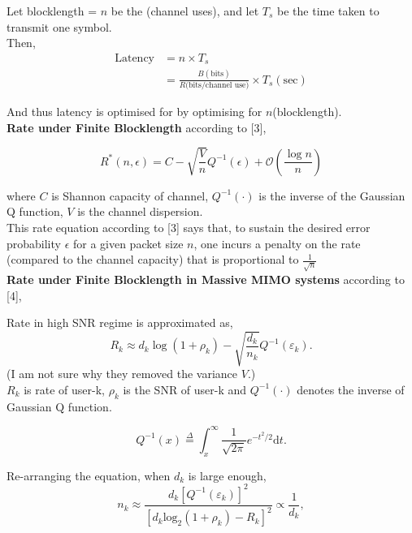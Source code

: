 \documentclass[a4paper, 12pt, onecolumn, journal, twoside, draftclsnofoot]{IEEEtran}
\begin{document}
Let blocklength = $n$ be the (channel uses), and let $T_s$ be the time taken to transmit one symbol. \\

Then,
\begin{equation*}
\begin{split}
\text{Latency} 
    &= n \times T_s \\ 
    &= \frac{B (\text{bits})}{R\text{(bits/channel use)}} \times T_s (\text{sec})
\end{split}
\end{equation*}

And thus latency is optimised for by optimising for $n$(blocklength). \\

\textbf{Rate under Finite Blocklength} according to [3],

\begin{equation*}
    R^*(n,\epsilon)=C-\sqrt{\frac{V}{n}}Q^{-1}(\epsilon)+\mathcal{O}\left(\frac{\log n}{n}\right)
\end{equation*}

where $C$ is Shannon capacity of channel, $Q^{-1}(\cdot)$ is the inverse of the Gaussian Q function, $V$ is the channel dispersion.  \\

This rate equation according to [3] says that, to sustain the desired error probability $\epsilon$ for a given packet size $n$, one incurs a penalty on the rate (compared to the channel capacity) that is proportional to $\frac{1}{\sqrt{n}}$ \\

\textbf{Rate under Finite Blocklength in Massive MIMO systems} according to [4], 


Rate in high SNR regime is approximated as,
\begin{equation*}
    R_k\approx d_k\log\left(1+\rho_k\right)-\sqrt{\frac{d_k}{n_k}}Q^{-1}\left(\varepsilon_k\right).
\end{equation*}
(I am not sure why they removed the variance $V$.)\\
$R_k$ is rate of user-k,  $\rho_k$ is the SNR of user-k and $Q^{-1}(\cdot)$ denotes the inverse of Gaussian Q function. 


\begin{equation*}
Q^{-1}(x) \overset{\Delta}{\operatorname*{=}}\int_{x}^{\infty}\frac{1}{\sqrt{2\pi}}e^{-t^{2}/2}\mathrm{d}t.
\end{equation*}

Re-arranging the equation, when $d_k$ is large enough, 
\begin{equation*}
    n_k\approx\frac{d_k\left[Q^{-1}\left(\varepsilon_k\right)\right]^2}{\left[d_k\mathrm{log}_2\left(1+\rho_k\right)-R_k\right]^2}\propto\frac{1}{d_k},
\end{equation*}
\end{document}
